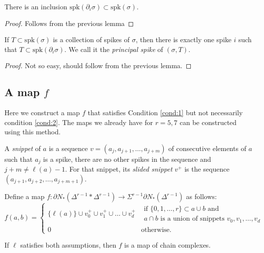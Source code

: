 	\begin{lemma} There is an inclusion $\mathrm{spk}(\partial_i\sigma)\subset \mathrm{spk}(\sigma)$.
	\end{lemma}
	\begin{proof} Follows from the previous lemma
	\end{proof}
	\begin{lemma} If $T\subset \mathrm{spk}(\sigma)$ is a collection of spikes of $\sigma$, then there is exactly one spike $i$ such that $T\subset \mathrm{spk}(\partial_i\sigma)$. We call it the \emph{principal spike} of $(\sigma,T)$.
	\end{lemma}
	\begin{proof} Not so easy, should follow from the previous lemma.

	\end{proof}
	\subsection{A map $f$} Here we construct a map $f$ that satisfies Condition \eqref{cond:1} but not necessarily condition \eqref{cond:2}. The maps we already have for $r=5,7$ can be constructed using this method.
	\begin{definition}  %
		A \emph{snippet} of $a$ is a sequence $v = (a_j,a_{j+1},\ldots,a_{j+m})$ of consecutive elements of $a$ such that $a_j$ is a spike, there are no other spikes in the sequence and $j+m\neq \ell(a)-1$. For that snippet, its \emph{slided snippet} $v^+$ is the sequence $(a_{j+1},a_{j+2},\ldots,a_{j+m+1})$.
	\end{definition}
	Define a map $f\colon \partial N_*(\Delta^{r-1}*\Delta^{r-1})\to \Sigma^{r-1}\partial N_*(\Delta^{r-1})$ as follows:
	\[
	f(a,b) = \begin{cases}
		\{\ell(a)\}\cup v_0^+\cup v_1^+\cup\ldots \cup v_d^+ & \begin{array}{l} \text{if $\{0,1,\ldots,r\}\subset a\cup b$ and} \\ \text{$a\cap b$ is a union of snippets $v_0,v_1,\ldots,v_d$}\end{array} \\
		0 & \text{otherwise.}
	\end{cases}
	\]
	\begin{lemma} If $\ell$ satisfies both assumptions, then $f$ is a map of chain complexes.
	\end{lemma}
